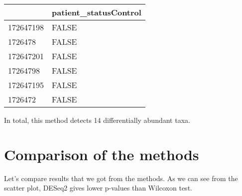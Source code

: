 \documentclass[
  oneside]{book}
\newenvironment{Shaded}{\begin{snugshade}}{\end{snugshade}}
\newcommand{\AttributeTok}[1]{\textcolor[rgb]{0.77,0.63,0.00}{#1}}
\newcommand{\DecValTok}[1]{\textcolor[rgb]{0.00,0.00,0.81}{#1}}
\newcommand{\FunctionTok}[1]{\textcolor[rgb]{0.00,0.00,0.00}{#1}}
\newcommand{\NormalTok}[1]{#1}
\newcommand{\OtherTok}[1]{\textcolor[rgb]{0.56,0.35,0.01}{#1}}
\newcommand{\SpecialCharTok}[1]{\textcolor[rgb]{0.00,0.00,0.00}{#1}}
\newcommand{\StringTok}[1]{\textcolor[rgb]{0.31,0.60,0.02}{#1}}
\begin{document}
\begin{Shaded}
\end{Shaded}

\begin{table}
\centering
\begin{tabular}{l|l}
\hline
  & patient\_statusControl\\
\hline
172647198 & FALSE\\
\hline
1726478 & FALSE\\
\hline
172647201 & FALSE\\
\hline
17264798 & FALSE\\
\hline
172647195 & FALSE\\
\hline
1726472 & FALSE\\
\hline
\end{tabular}
\end{table}

In total, this method detects 14 differentially abundant taxa.

\hypertarget{comparison-of-the-methods}{%
\section{Comparison of the methods}\label{comparison-of-the-methods}}

Let's compare results that we got from the methods.
As we can see from the scatter plot, DESeq2 gives lower p-values than Wilcoxon test.

\begin{Shaded}
\end{Shaded}
\end{document}
